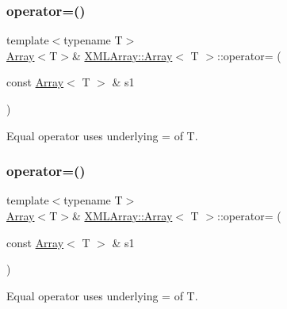 \subsubsection{\texorpdfstring{operator=()}{operator=()}\hspace{0.1cm}{\footnotesize\ttfamily [2/9]}}
{\footnotesize\ttfamily template$<$typename T$>$ \\
\mbox{\hyperlink{classXMLArray_1_1Array}{Array}}$<$T$>$\& \mbox{\hyperlink{classXMLArray_1_1Array}{X\+M\+L\+Array\+::\+Array}}$<$ T $>$\+::operator= (\begin{DoxyParamCaption}\item[{const \mbox{\hyperlink{classXMLArray_1_1Array}{Array}}$<$ T $>$ \&}]{s1 }\end{DoxyParamCaption})\hspace{0.3cm}{\ttfamily [inline]}}



Equal operator uses underlying = of T. 

\mbox{\label{classXMLArray_1_1Array_a99fd481573c47ab9a9e35ed597575b0e}} 
\subsubsection{\texorpdfstring{operator=()}{operator=()}\hspace{0.1cm}{\footnotesize\ttfamily [3/9]}}
{\footnotesize\ttfamily template$<$typename T$>$ \\
\mbox{\hyperlink{classXMLArray_1_1Array}{Array}}$<$T$>$\& \mbox{\hyperlink{classXMLArray_1_1Array}{X\+M\+L\+Array\+::\+Array}}$<$ T $>$\+::operator= (\begin{DoxyParamCaption}\item[{const \mbox{\hyperlink{classXMLArray_1_1Array}{Array}}$<$ T $>$ \&}]{s1 }\end{DoxyParamCaption})\hspace{0.3cm}{\ttfamily [inline]}}



Equal operator uses underlying = of T. 

\mbox{\label{classXMLArray_1_1Array_a3051ecb95c6d07f9ad80e72a2fd50c61}} 
